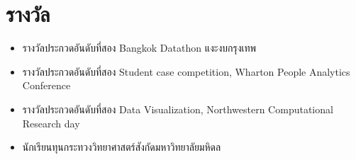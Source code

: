 \section{\sc รางวัล}

\begin{itemize}[leftmargin=0cm, label={}]
\itemsep0em

\item รางวัลประกวดอันดับที่สอง Bangkok Datathon แงะงบกรุงเทพ

\item รางวัลประกวดอันดับที่สอง Student case competition, Wharton People Analytics Conference

\item รางวัลประกวดอันดับที่สอง Data Visualization, Northwestern Computational Research day

\item นักเรียนทุนกระทวงวิทยาศาสตร์สังกัดมหาวิทยาลัยมหิดล

\end{itemize}
